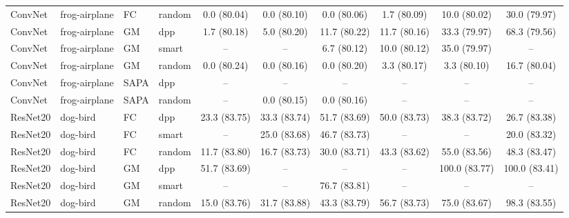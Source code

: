 \begin{table}[h]
{\begin{tabular}{llllcccccc}
ConvNet & frog-airplane & FC & random
& 0.0 \small{(80.04)}
& 0.0 \small{(80.10)}
& 0.0 \small{(80.06)}
& 1.7 \small{(80.09)}
& 10.0 \small{(80.02)}
& 30.0 \small{(79.97)} \\ [1em]


ConvNet & frog-airplane & GM & dpp
& 1.7 \small{(80.18)}
& 5.0 \small{(80.20)}
& 11.7 \small{(80.22)}
& 11.7 \small{(80.16)}
& 33.3 \small{(79.97)}
& 68.3 \small{(79.56)} \\

ConvNet & frog-airplane & GM & smart
& --
& --
& 6.7 \small{(80.12)}
& 10.0 \small{(80.12)}
& 35.0 \small{(79.97)}
& -- \\
ConvNet & frog-airplane & GM & random
& 0.0 \small{(80.24)}
& 0.0 \small{(80.16)}
& 0.0 \small{(80.20)}
& 3.3 \small{(80.17)}
& 3.3 \small{(80.10)}
& 16.7 \small{(80.04)} \\ [1em]

ConvNet & frog-airplane & SAPA & dpp
& --
& --
& --
& --
& --
& -- \\


ConvNet & frog-airplane & SAPA & random
& --
& 0.0 \small{(80.15)}
& 0.0 \small{(80.16)}
& --
& --
& -- \\ [0.1em] 


\hline 


ResNet20 & dog-bird & FC & dpp
& 23.3 \small{(83.75)}
& 33.3 \small{(83.74)}
& 51.7 \small{(83.69)}
& 50.0 \small{(83.73)}
& 38.3 \small{(83.72)}
& 26.7 \small{(83.38)} \\

ResNet20 & dog-bird & FC & smart
& --
& 25.0 \small{(83.68)}
& 46.7 \small{(83.73)}
& --
& --
& 20.0 \small{(83.32)} \\

ResNet20 & dog-bird & FC & random
& 11.7 \small{(83.80)}
& 16.7 \small{(83.73)}
& 30.0 \small{(83.71)}
& 43.3 \small{(83.62)}
& 55.0 \small{(83.56)}
& 48.3 \small{(83.47)} \\
[1em]


ResNet20 & dog-bird & GM & dpp
& 51.7 \small{(83.69)}
& --
& --
& --
& 100.0 \small{(83.77)}
& 100.0 \small{(83.41)} \\

ResNet20 & dog-bird & GM & smart
& --
& --
& 76.7 \small{(83.81)}
& --
& --
& -- \\

ResNet20 & dog-bird & GM & random
& 15.0 \small{(83.76)}
& 31.7 \small{(83.88)}
& 43.3 \small{(83.79)}
& 56.7 \small{(83.73)}
& 75.0 \small{(83.67)}
& 98.3 \small{(83.55)} \\ [1em]


\end{tabular}}
\end{table}
